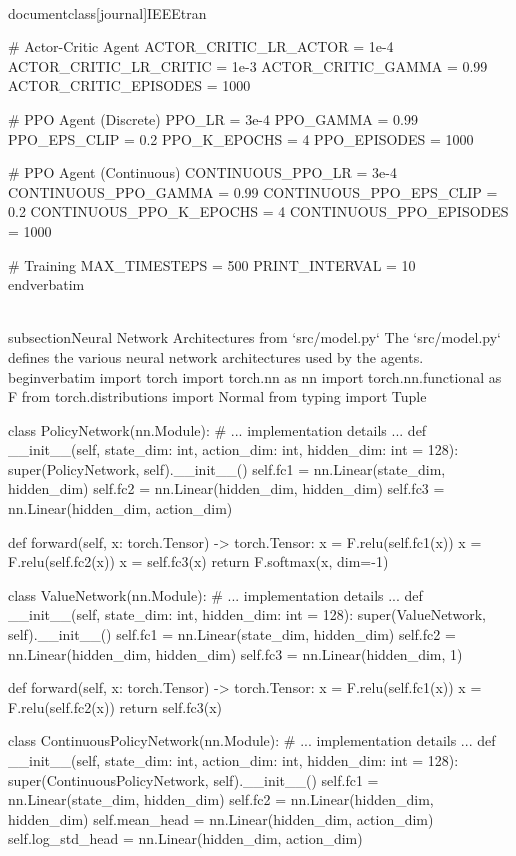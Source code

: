 \\documentclass[journal]{IEEEtran}
\begin{document}
    # Actor-Critic Agent
    ACTOR_CRITIC_LR_ACTOR = 1e-4
    ACTOR_CRITIC_LR_CRITIC = 1e-3
    ACTOR_CRITIC_GAMMA = 0.99
    ACTOR_CRITIC_EPISODES = 1000

    # PPO Agent (Discrete)
    PPO_LR = 3e-4
    PPO_GAMMA = 0.99
    PPO_EPS_CLIP = 0.2
    PPO_K_EPOCHS = 4
    PPO_EPISODES = 1000

    # PPO Agent (Continuous)
    CONTINUOUS_PPO_LR = 3e-4
    CONTINUOUS_PPO_GAMMA = 0.99
    CONTINUOUS_PPO_EPS_CLIP = 0.2
    CONTINUOUS_PPO_K_EPOCHS = 4
    CONTINUOUS_PPO_EPISODES = 1000

    # Training
    MAX_TIMESTEPS = 500
    PRINT_INTERVAL = 10
\\end{verbatim}

\\subsection{Neural Network Architectures from `src/model.py`}
The `src/model.py` defines the various neural network architectures used by the agents.
\\begin{verbatim}
import torch
import torch.nn as nn
import torch.nn.functional as F
from torch.distributions import Normal
from typing import Tuple

class PolicyNetwork(nn.Module):
    # ... implementation details ...
    def __init__(self, state_dim: int, action_dim: int, hidden_dim: int = 128):
        super(PolicyNetwork, self).__init__()
        self.fc1 = nn.Linear(state_dim, hidden_dim)
        self.fc2 = nn.Linear(hidden_dim, hidden_dim)
        self.fc3 = nn.Linear(hidden_dim, action_dim)

    def forward(self, x: torch.Tensor) -> torch.Tensor:
        x = F.relu(self.fc1(x))
        x = F.relu(self.fc2(x))
        x = self.fc3(x)
        return F.softmax(x, dim=-1)

class ValueNetwork(nn.Module):
    # ... implementation details ...
    def __init__(self, state_dim: int, hidden_dim: int = 128):
        super(ValueNetwork, self).__init__()
        self.fc1 = nn.Linear(state_dim, hidden_dim)
        self.fc2 = nn.Linear(hidden_dim, hidden_dim)
        self.fc3 = nn.Linear(hidden_dim, 1)

    def forward(self, x: torch.Tensor) -> torch.Tensor:
        x = F.relu(self.fc1(x))
        x = F.relu(self.fc2(x))
        return self.fc3(x)

class ContinuousPolicyNetwork(nn.Module):
    # ... implementation details ...
    def __init__(self, state_dim: int, action_dim: int, hidden_dim: int = 128):
        super(ContinuousPolicyNetwork, self).__init__()
        self.fc1 = nn.Linear(state_dim, hidden_dim)
        self.fc2 = nn.Linear(hidden_dim, hidden_dim)
        self.mean_head = nn.Linear(hidden_dim, action_dim)
        self.log_std_head = nn.Linear(hidden_dim, action_dim)
\end{document}
